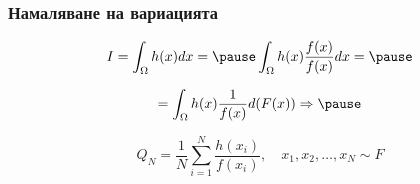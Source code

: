 
%




\begin{frame}
  \frametitle{Намаляване на вариацията}
  \begin{equation*}
  I = 
  \int_{\Omega} h(x) d x = \pause 
  \int_{\Omega} h(x) \frac{f(x)}{f(x)} dx = \pause
  \end{equation*}

  \begin{equation*}
  = \int_{\Omega} h(x) \frac{1}{f(x)} d(F(x)) \Rightarrow \pause
  \end{equation*}

  \begin{equation*}
  Q_N = \frac{1}{N} \sum_{i=1}^N \frac{h(x_i)}{f(x_i)} , \quad 
  x_1, x_2, \dots, x_N \sim F 
  \end{equation*}

\end{frame}

